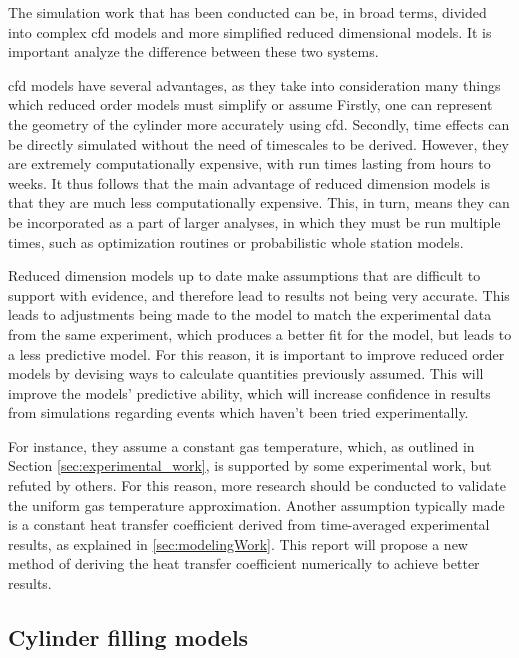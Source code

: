 The simulation work that has been conducted can be, in broad terms, divided into complex \gls{cfd} models and more simplified reduced dimensional models. It is important analyze the difference between these two systems. 

\Gls{cfd} models have several advantages, as they take into consideration many things which reduced order models must simplify or assume Firstly, one can represent the geometry of the cylinder more accurately using \gls{cfd}. Secondly, time effects can be directly simulated without the need of timescales to be derived. However, they are extremely computationally expensive, with run times lasting from hours to weeks. It thus follows that the main advantage of reduced dimension models is that they are much less computationally expensive. This, in turn, means they can be incorporated as a part of larger analyses, in which they must be run multiple times, such as optimization routines or probabilistic whole station models.

Reduced dimension models up to date make assumptions that are difficult to support with evidence, and therefore lead to results not being very accurate. This leads to adjustments being made to the model to match the experimental data from the same experiment, which produces a better fit for the model, but leads to a less predictive model. For this reason, it is important to improve reduced order models by devising ways to calculate quantities previously assumed. This will improve the models' predictive ability, which will increase confidence in results from simulations regarding events which haven't been tried experimentally.

For instance, they assume a constant gas temperature, which, as outlined in Section \ref{sec:experimental_work}, is supported by some experimental work, but refuted by others. For this reason, more research should be conducted to validate the uniform gas temperature approximation. Another assumption typically made is a constant heat transfer coefficient derived from time-averaged experimental results, as explained in \cref{sec:modelingWork}. This report will propose a new method of deriving the heat transfer coefficient numerically to achieve better results.




\subsection{Cylinder filling models}

